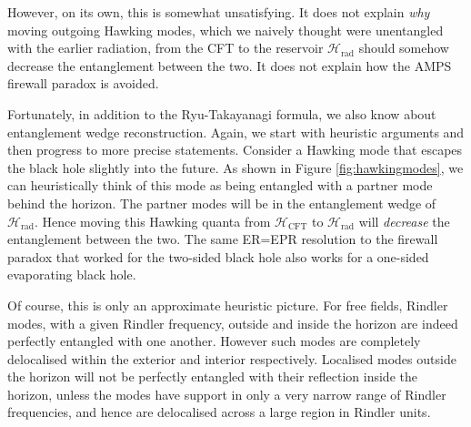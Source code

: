 \documentclass[11pt,a4paper]{article}
\begin{document}
However, on its own, this is somewhat unsatisfying. It does not explain \emph{why} moving outgoing Hawking modes, which we naively thought were unentangled with the earlier radiation, from the CFT to the reservoir $\mathcal{H}_\text{rad}$ should somehow decrease the entanglement between the two. It does not explain how the AMPS firewall paradox \cite{almheiri2013black} is avoided.

Fortunately, in addition to the Ryu-Takayanagi formula, we also know about entanglement wedge reconstruction. Again, we start with heuristic arguments and then progress to more precise statements. Consider a Hawking mode that escapes the black hole slightly into the future. As shown in Figure \ref{fig:hawkingmodes}, we can heuristically think of this mode as being entangled with a partner mode behind the horizon. The partner modes will be in the entanglement wedge of $\mathcal{H}_\text{rad}$. Hence moving this Hawking quanta from $\mathcal{H}_\text{CFT}$ to $\mathcal{H}_\text{rad}$ will \emph{decrease} the entanglement between the two. The same ER=EPR resolution \cite{maldacena2013cool} to the firewall paradox that worked for the two-sided black hole also works for a one-sided evaporating black hole.

Of course, this is only an approximate heuristic picture. For free fields, Rindler modes, with a given Rindler frequency, outside and inside the horizon are indeed perfectly entangled with one another. However such modes are completely delocalised within the exterior and interior respectively. Localised modes outside the horizon will not be perfectly entangled with their reflection inside the horizon, unless the modes have support in only a very narrow range of Rindler frequencies, and hence are delocalised across a large region in Rindler units.
\end{document}
